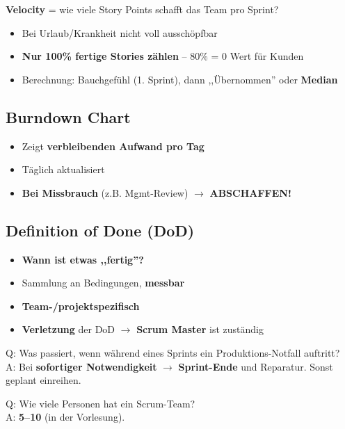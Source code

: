 \documentclass[11pt,a4paper]{article}
\begin{document}
\begin{keyfacts}
\textbf{Velocity} = wie viele Story Points schafft das Team pro Sprint?
\begin{itemize}
  \item Bei Urlaub/Krankheit nicht voll ausschöpfbar
  \item \textbf{Nur 100\% fertige Stories zählen} -- 80\% = 0 Wert für Kunden
  \item Berechnung: Bauchgefühl (1. Sprint), dann ,,Übernommen'' oder \textbf{Median}
\end{itemize}
\end{keyfacts}

\subsection{Burndown Chart}

\begin{keyfacts}
\begin{itemize}
  \item Zeigt \textbf{verbleibenden Aufwand pro Tag}
  \item Täglich aktualisiert
  \item \textbf{Bei Missbrauch} (z.B. Mgmt-Review) $\rightarrow$ \textbf{ABSCHAFFEN!}
\end{itemize}
\end{keyfacts}

\subsection{Definition of Done (DoD)}

\begin{keyfacts}
\begin{itemize}
  \item \textbf{Wann ist etwas ,,fertig''?}
  \item Sammlung an Bedingungen, \textbf{messbar}
  \item \textbf{Team-/projektspezifisch}
  \item \textbf{Verletzung} der DoD $\rightarrow$ \textbf{Scrum Master} ist zuständig
\end{itemize}
\end{keyfacts}

\begin{quickcheck}
Q: Was passiert, wenn während eines Sprints ein Produktions-Notfall auftritt?\\
A: Bei \textbf{sofortiger Notwendigkeit} $\rightarrow$ \textbf{Sprint-Ende} und Reparatur. Sonst geplant einreihen.

Q: Wie viele Personen hat ein Scrum-Team?\\
A: \textbf{5--10} (in der Vorlesung).
\end{quickcheck}
\end{document}

